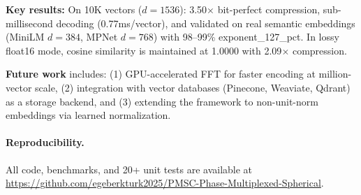 \documentclass[11pt,a4paper]{article}
\begin{document}
\textbf{Key results:} On 10K vectors ($d=1536$): 3.50$\times$ bit-perfect compression, sub-millisecond decoding (0.77ms/vector), and validated on real semantic embeddings (MiniLM $d=384$, MPNet $d=768$) with 98--99\% exponent\_127\_pct. In lossy float16 mode, cosine similarity is maintained at 1.0000 with 2.09$\times$ compression.

\textbf{Future work} includes: (1) GPU-accelerated FFT for faster encoding at million-vector scale, (2) integration with vector databases (Pinecone, Weaviate, Qdrant) as a storage backend, and (3) extending the framework to non-unit-norm embeddings via learned normalization.

\paragraph{Reproducibility.} All code, benchmarks, and 20+ unit tests are available at \url{https://github.com/egeberkturk2025/PMSC-Phase-Multiplexed-Spherical}.



\end{document}
